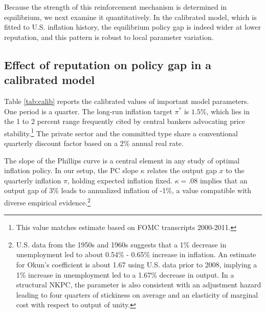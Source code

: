 \documentclass[12pt,letter,leqno]{article}
\theoremstyle{asn}
\theoremstyle{lem}
\theoremstyle{slem}
\theoremstyle{prop}
\theoremstyle{appprop}
\theoremstyle{rem}
\theoremstyle{defn}
\begin{document}
Because the strength of this reinforcement mechanism is determined in equilibrium, we next examine it quantitatively. In the calibrated model, which is fitted to U.S. inflation history, the equilibrium policy gap is indeed wider at lower reputation, and this pattern is robust to local parameter variation.


\subsection{Effect of reputation on policy gap in a calibrated model} 
Table \ref{tab:calib} reports the calibrated values of important model parameters. One period is a quarter. The long-run inflation target $\pi^*$ is $1.5\%$, which lies in the 1 to 2 percent range frequently cited by central bankers advocating price stability.\footnote{This value matches  \cite{Shapiro2019} estimate based on FOMC transcripts 2000-2011. }
The private sector and the committed type share a conventional quarterly discount factor based on a 2$\%$ annual real rate. 

The slope of the Phillips curve is a  central element in any study of optimal inflation policy. In our setup, the PC slope $\kappa$ relates the output gap $x$ to the quarterly inflation $\pi$, 
holding expected inflation fixed.
$\kappa=.08$ implies that an output gap of 3\% leads to annualized inflation of -1\%,
a value compatible with diverse empirical evidence.\footnote{U.S. data from the 1950s and 1960s suggests that a 1\% decrease in unemployment led to about 0.54\% - 0.65\% increase in inflation. An estimate for Okun's coefficient is about 1.67 using U.S. data prior to 2008, implying a 1\% increase in unemployment led to a 1.67\% decrease in output. In a structural NKPC, the parameter is also consistent with an adjustment hazard leading to four quarters of stickiness on average and an elasticity of marginal cost with respect to output of unity. } 
\end{document}
